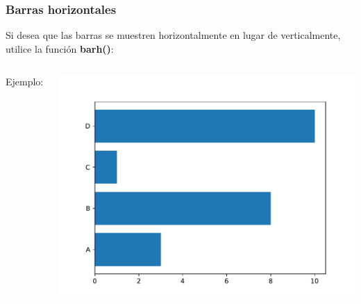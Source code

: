 \begin{frame}[fragile]
  \frametitle{Barras horizontales}

  \vspace{\baselineskip}
  Si desea que las barras se muestren horizontalmente
  en lugar de verticalmente, utilice la función \textbf{barh()}:
  \begin{columns}
        \begin{exampleblock}{Ejemplo:}
          
        \end{exampleblock}
      \pausa
      \parbox{\textwidth}{\includegraphics[width=\linewidth]{ejemplos/e08.pdf}}
  \end{columns}
\end{frame}

